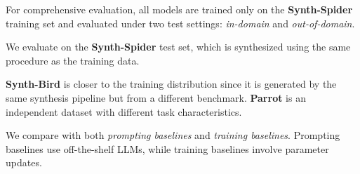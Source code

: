 
For comprehensive evaluation, all models are trained only on the \textbf{Synth-Spider} training set and evaluated under two test settings: \emph{in-domain} and \emph{out-of-domain}.

We evaluate on the \textbf{Synth-Spider} test set, which is synthesized using the same procedure as the training data.

\textbf{Synth-Bird} is closer to the training distribution since it is generated by the same synthesis pipeline but from a different benchmark. \textbf{Parrot} is an independent dataset with different task characteristics. 


We compare \sys with both \emph{prompting baselines} and \emph{training baselines}. Prompting baselines use off-the-shelf LLMs, while training baselines involve parameter updates.


